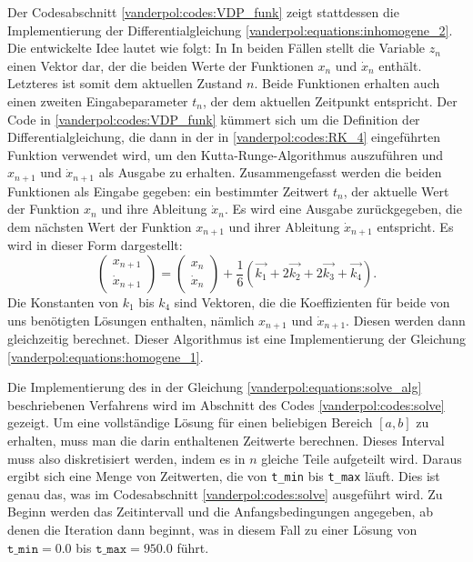 Der Codesabschnitt \ref{vanderpol:codes:VDP_funk} zeigt stattdessen die Implementierung der Differentialgleichung \ref{vanderpol:equations:inhomogene_2}.  Die entwickelte Idee lautet wie folgt: In In beiden Fällen stellt die Variable $z_n$ einen Vektor dar, der die beiden Werte der Funktionen $x_n$ und $\dot{x}_n$ enthält. Letzteres ist somit dem aktuellen Zustand $n$. Beide Funktionen erhalten auch einen zweiten Eingabeparameter $t_n$, der dem aktuellen Zeitpunkt entspricht. Der Code in \ref{vanderpol:codes:VDP_funk} kümmert sich um die Definition der Differentialgleichung, die dann in der in \ref{vanderpol:codes:RK_4} eingeführten Funktion verwendet wird, um den Kutta-Runge-Algorithmus auszuführen und $x_{n+1}$ und $\dot{x}_{n+1}$ als Ausgabe zu erhalten. Zusammengefasst werden die beiden Funktionen als Eingabe gegeben: ein bestimmter Zeitwert $t_n$, der aktuelle Wert der Funktion $x_{n}$ und ihre Ableitung $\dot{x}_{n}$. Es wird eine Ausgabe zurückgegeben, die dem nächsten Wert der Funktion $x_{n+1}$ und ihrer Ableitung $\dot{x}_{n+1}$ entspricht. Es wird in dieser Form dargestellt:
\begin{equation}
\begin{pmatrix}x_{n+1} \\ \dot{x}_{n+1} \end{pmatrix} = \begin{pmatrix}x_{n} \\ \dot{x}_{n} \end{pmatrix} + \frac{1}{6}(\vec{k_1} + 2\vec{k_2} + 2\vec{k_3} + \vec{k_4}).
\label{vanderpol:equations:solve_alg}
\end{equation}
Die Konstanten von $k_1$ bis $k_4$ sind Vektoren, die die Koeffizienten für beide von uns benötigten Lösungen enthalten, nämlich $x_{n+1}$ und $\dot{x}_{n+1}$.
Diesen werden dann gleichzeitig berechnet. Dieser Algorithmus ist eine Implementierung der Gleichung \ref{vanderpol:equations:homogene_1}.

Die Implementierung des in der Gleichung \ref{vanderpol:equations:solve_alg} beschriebenen Verfahrens wird im Abschnitt des Codes \ref{vanderpol:codes:solve} gezeigt.
Um eine vollständige Lösung für einen beliebigen Bereich $[a, b]$ zu erhalten, muss man die darin enthaltenen Zeitwerte berechnen. Dieses Interval muss also diskretisiert werden, indem es in $n$ gleiche Teile aufgeteilt wird. Daraus ergibt sich eine Menge von Zeitwerten, die von \texttt{t\_min} bis \texttt{t\_max} läuft.
Dies ist genau das, was im Codesabschnitt \ref{vanderpol:codes:solve} ausgeführt wird. Zu Beginn werden das Zeitintervall und die Anfangsbedingungen angegeben, ab denen die Iteration dann beginnt, was in diesem Fall zu einer Lösung von $\texttt{t\_min}=0.0$ bis $\texttt{t\_max}=950.0$ führt.
